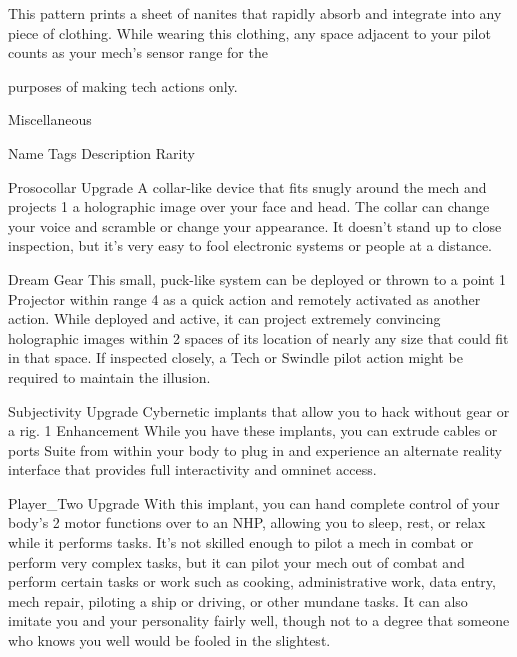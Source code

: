 This pattern prints a sheet of nanites that rapidly absorb and integrate into any piece of clothing. While
wearing this clothing, any space adjacent to your pilot counts as your mech's sensor range for the

purposes of making tech actions only.


                                                 Miscellaneous

 Name                Tags        Description                                                               Rarity

 Prosocollar         Upgrade     A collar-like device that fits snugly around the mech and projects         1
                                 a holographic image over your face and head. The collar can
                                 change your voice and scramble or change your appearance. It
                                 doesn't stand up to close inspection, but it's very easy to fool
                                 electronic systems or people at a distance.




Dream                 Gear         This small, puck-like system can be deployed or thrown to a point                 1
Projector                          within range 4 as a quick action and remotely activated as another
                                   action. While deployed and active, it can project extremely
                                   convincing holographic images within 2 spaces of its location of
                                   nearly any size that could fit in that space. If inspected closely, a
                                   Tech or Swindle pilot action might be required to maintain the
                                   illusion.

Subjectivity          Upgrade      Cybernetic implants that allow you to hack without gear or a rig.                 1
Enhancement                        While you have these implants, you can extrude cables or ports
Suite                              from within your body to plug in and experience an alternate
                                   reality interface that provides full interactivity and omninet access.

Player\_Two            Upgrade      With this implant, you can hand complete control of your body's                   2
                                   motor functions over to an NHP, allowing you to sleep, rest, or
                                   relax while it performs tasks. It's not skilled enough to pilot a
                                   mech in combat or perform very complex tasks, but it can pilot
                                   your mech out of combat and perform certain tasks or work such
                                   as cooking, administrative work, data entry, mech repair, piloting a
                                   ship or driving, or other mundane tasks. It can also imitate you
                                   and your personality fairly well, though not to a degree that
                                   someone who knows you well would be fooled in the slightest.
